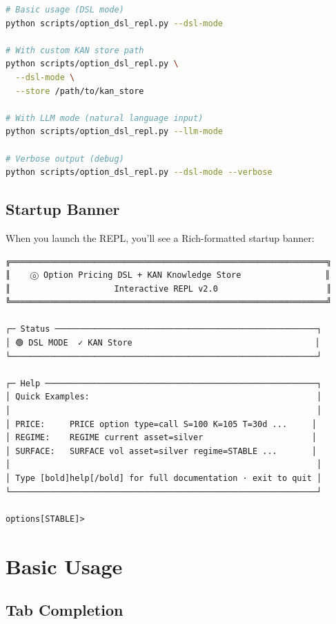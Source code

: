 \documentclass[12pt,oneside,openany]{book}
\begin{document}
\begin{lstlisting}[language=bash]
# Basic usage (DSL mode)
python scripts/option_dsl_repl.py --dsl-mode

# With custom KAN store path
python scripts/option_dsl_repl.py \
  --dsl-mode \
  --store /path/to/kan_store

# With LLM mode (natural language input)
python scripts/option_dsl_repl.py --llm-mode

# Verbose output (debug)
python scripts/option_dsl_repl.py --dsl-mode --verbose
\end{lstlisting}

\subsection{Startup Banner}

When you launch the REPL, you'll see a Rich-formatted startup banner:

\begin{lstlisting}
╔════════════════════════════════════════════════════════════════╗
║    ⓞ Option Pricing DSL + KAN Knowledge Store                 ║
║                     Interactive REPL v2.0                      ║
╚════════════════════════════════════════════════════════════════╝

┌─ Status ─────────────────────────────────────────────────────┐
│ 🟢 DSL MODE  ✓ KAN Store                                     │
└──────────────────────────────────────────────────────────────┘

┌─ Help ───────────────────────────────────────────────────────┐
│ Quick Examples:                                              │
│                                                              │
│ PRICE:     PRICE option type=call S=100 K=105 T=30d ...     │
│ REGIME:    REGIME current asset=silver                      │
│ SURFACE:   SURFACE vol asset=silver regime=STABLE ...       │
│                                                              │
│ Type [bold]help[/bold] for full documentation · exit to quit │
└──────────────────────────────────────────────────────────────┘

options[STABLE]>
\end{lstlisting}

\section{Basic Usage}

\subsection{Tab Completion}
\end{document}
